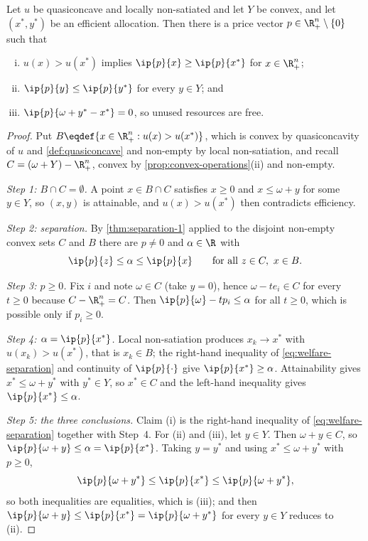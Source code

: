 \begin{theorem}\label{prop:second-welfare}
	Let $u$ be quasiconcave and locally non-satiated and let $Y$ be convex, and let
	$(x^\ast,y^\ast)$ be an efficient allocation. Then there is a price vector
	$p\in\R^n_+\setminus\{0\}$ such that
	\begin{enumerate}[(i)]
		\item $u(x)>u(x^\ast)$ implies $\ip{p}{x}\geq\ip{p}{x^\ast}$ for
		      $x\in\R^n_+$;
		\item $\ip{p}{y}\leq\ip{p}{y^\ast}$ for every $y\in Y$; and
		\item $\ip{p}{\omega+y^\ast-x^\ast}=0$, so unused resources are free.
	\end{enumerate}
\end{theorem}

\begin{proof}
	Put $B\eqdef\{x\in\R^n_+ : u(x)>u(x^\ast)\}$, which is convex by
	quasiconcavity of $u$ and \autoref{def:quasiconcave} and non-empty by local
	non-satiation, and recall $C=(\omega+Y)-\R^n_+$, convex by
	\autoref{prop:convex-operations}(ii) and non-empty.

	\emph{Step 1: $B\cap C=\emptyset$.} A point $x\in B\cap C$ satisfies $x\geq0$
	and $x\leq\omega+y$ for some $y\in Y$, so $(x,y)$ is attainable, and
	$u(x)>u(x^\ast)$ then contradicts efficiency.

	\emph{Step 2: separation.} By \autoref{thm:separation-1} applied to the
	disjoint non-empty convex sets $C$ and $B$ there are $p\neq0$ and $\alpha\in\R$
	with
	\begin{equation}\label{eq:welfare-separation}
		\ip{p}{z}\leq\alpha\leq\ip{p}{x}\qquad\text{for all }z\in C,\ x\in B .
	\end{equation}

	\emph{Step 3: $p\geq0$.} Fix $i$ and note $\omega\in C$ (take $y=0$), hence
	$\omega-te_i\in C$ for every $t\geq0$ because $C-\R^n_+=C$. Then
	$\ip{p}{\omega}-tp_i\leq\alpha$ for all $t\geq0$, which is possible only if
	$p_i\geq0$.

	\emph{Step 4: $\alpha=\ip{p}{x^\ast}$.} Local non-satiation produces
	$x_k\to x^\ast$ with $u(x_k)>u(x^\ast)$, that is $x_k\in B$; the right-hand
	inequality of \eqref{eq:welfare-separation} and continuity of
	$\ip{p}{\cdot}$ give $\ip{p}{x^\ast}\geq\alpha$. Attainability gives
	$x^\ast\leq\omega+y^\ast$ with $y^\ast\in Y$, so $x^\ast\in C$ and the
	left-hand inequality gives $\ip{p}{x^\ast}\leq\alpha$.

	\emph{Step 5: the three conclusions.} Claim (i) is the right-hand inequality of
	\eqref{eq:welfare-separation} together with Step~4. For (ii) and (iii), let
	$y\in Y$. Then $\omega+y\in C$, so $\ip{p}{\omega+y}\leq\alpha=\ip{p}{x^\ast}$.
	Taking $y=y^\ast$ and using $x^\ast\leq\omega+y^\ast$ with $p\geq0$,
	\[
		\ip{p}{\omega+y^\ast}\leq\ip{p}{x^\ast}\leq\ip{p}{\omega+y^\ast},
	\]
	so both inequalities are equalities, which is (iii); and then
	$\ip{p}{\omega+y}\leq\ip{p}{x^\ast}=\ip{p}{\omega+y^\ast}$ for every $y\in Y$
	reduces to (ii).
\end{proof}

